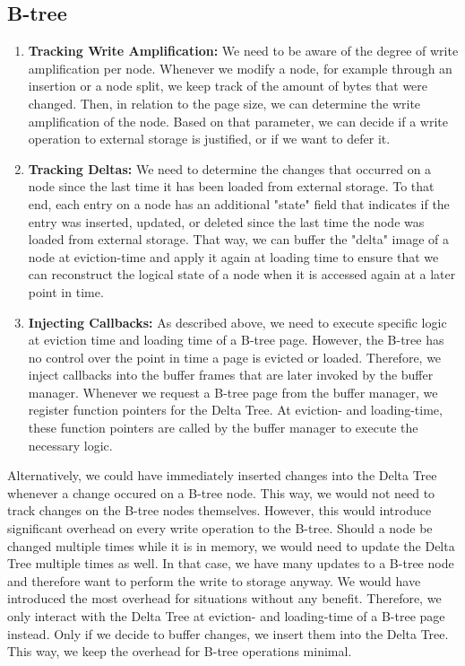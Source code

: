 \subsection*{B-tree}
\begin{enumerate}
  \item \textbf{Tracking Write Amplification:}
We need to be aware of the degree of write amplification per node. 
Whenever we modify a node, for example through an insertion or a node split, we keep track of the amount of bytes that were changed.
Then, in relation to the page size, we can determine the write amplification of the node.
Based on that parameter, we can decide if a write operation to external storage is justified, or if we want to defer it.
  \item \textbf{Tracking Deltas:} 
We need to determine the changes that occurred on a node since the last time it has been loaded from external storage.
To that end, each entry on a node has an additional "state" field that indicates if the entry was inserted, updated, or deleted since the last time the node was loaded from external storage.
That way, we can buffer the "delta" image of a node at eviction-time and apply it again at loading time to ensure that we can reconstruct the logical state of a node when it is accessed again at a later point in time.
\item \textbf{Injecting Callbacks:}
As described above, we need to execute specific logic at eviction time and loading time of a B-tree page.
However, the B-tree has no control over the point in time a page is evicted or loaded.
Therefore, we inject callbacks into the buffer frames that are later invoked by the buffer manager.
Whenever we request a B-tree page from the buffer manager, we register function pointers for the Delta Tree.
At eviction- and loading-time, these function pointers are called by the buffer manager to execute the necessary logic.
\end{enumerate}

Alternatively, we could have immediately inserted changes into the Delta Tree whenever a change occured on a B-tree node.
This way, we would not need to track changes on the B-tree nodes themselves.
However, this would introduce significant overhead on every write operation to the B-tree.
Should a node be changed multiple times while it is in memory, we would need to update the Delta Tree multiple times as well.
In that case, we have many updates to a B-tree node and therefore want to perform the write to storage anyway.
We would have introduced the most overhead for situations without any benefit.
Therefore, we only interact with the Delta Tree at eviction- and loading-time of a B-tree page instead.
Only if we decide to buffer changes, we insert them into the Delta Tree.
This way, we keep the overhead for B-tree operations minimal.

